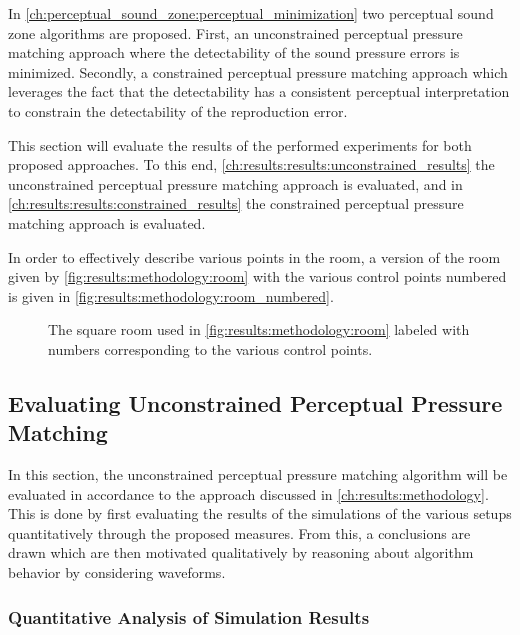 In \autoref{ch:perceptual_sound_zone:perceptual_minimization} two perceptual sound zone algorithms are proposed. 
First, an unconstrained perceptual pressure matching approach where the detectability of the sound pressure 
errors is minimized.
Secondly, a constrained perceptual pressure matching approach which leverages the fact that the 
detectability has a consistent 
perceptual interpretation to constrain the detectability of the reproduction error.

This section will evaluate the results of the performed experiments for both proposed approaches.
To this end, \autoref{ch:results:results:unconstrained_results} the unconstrained perceptual pressure 
matching approach is evaluated, and in  \autoref{ch:results:results:constrained_results} the constrained perceptual pressure 
matching approach is evaluated.

In order to effectively describe various points in the room, a version of the room 
given by \autoref{fig:results:methodology:room}
with the various control points numbered is given in \autoref{fig:results:methodology:room_numbered}.

\begin{figure}[]
    \centering
    \scalebox{1.0}{}
    \caption{The square room used in \autoref{fig:results:methodology:room} labeled with numbers corresponding to 
    the various control points.}
    \label{fig:results:methodology:room_numbered}
\end{figure}


\subsection{Evaluating Unconstrained Perceptual Pressure Matching}
\label{ch:results:results:unconstrained_results}
In this section, the unconstrained perceptual pressure matching algorithm will be evaluated in accordance to the 
approach discussed in \autoref{ch:results:methodology}.
This is done by first evaluating the results of the simulations of the various setups 
quantitatively through the proposed measures.
From this, a conclusions are drawn which are then motivated qualitatively by reasoning about algorithm behavior
by considering waveforms.

\subsubsection*{Quantitative Analysis of Simulation Results}

